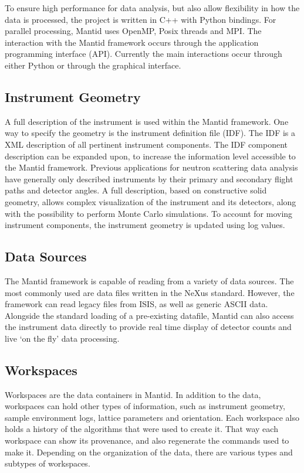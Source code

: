 \documentclass[1p]{elsarticle}
\begin{document}
To ensure high performance for data analysis, but also allow flexibility in how the data is processed, the project is written in C++ with Python bindings. For parallel processing, Mantid uses OpenMP\cite{openmp}, Posix threads and MPI\cite{mpi}. The interaction with the Mantid framework occurs through the application programming interface (API). Currently the main interactions occur through either Python or through the graphical interface. 


\subsection{Instrument Geometry}
A full description of the instrument is used within the Mantid framework. One way to specify the geometry is the instrument definition file (IDF). The IDF is a XML description of all pertinent instrument components.
The IDF component description can be expanded upon, to increase the information level accessible to the Mantid framework. 
Previous applications for neutron scattering data analysis have generally only described instruments by their primary and secondary flight paths and detector angles. A full description, based on constructive solid geometry, allows complex visualization of the instrument and its detectors, along with the possibility to perform Monte Carlo simulations.
To account for moving instrument components, the instrument geometry is updated using log values. 

\subsection{Data Sources}
The Mantid framework is capable of reading from a variety of data sources. The most commonly used are data files written in the NeXus standard. However, the framework can read legacy files from ISIS, as well as generic ASCII data. 
Alongside the standard loading of a pre-existing datafile, Mantid can also access the instrument data directly to provide real time display of detector counts and live `on the fly' data processing. 

\subsection{Workspaces}
Workspaces are the data containers in Mantid. In addition to the data, workspaces can hold other types of information, such as instrument geometry, sample environment logs, lattice parameters and orientation. Each workspace also holds a history of the algorithms that were used to create it. That way each workspace can show its provenance, and also regenerate the commands used to make it. Depending on the organization of the data, there are various types and subtypes of workspaces.
\end{document}
